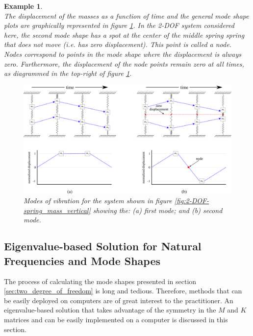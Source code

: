 \documentclass[12pt,letter]{article}
\newtheorem{ex}{Example}
\numberwithin{ex}{section} %
\newenvironment{example}{\begin{mdframed}[middlelinewidth=0.5mm]\begin{ex}\normalfont}{\end{ex}\end{mdframed}}
\numberwithin{re}{section} %
\begin{document}
\begin{example}
\begin{equation}
\end{equation}
The displacement of the masses as a function of time and the general mode shape plots are graphically represented in figure \ref{fig:2-DOF_mode_shape}. In the 2-DOF system considered here, the second mode shape has a spot at the center of the middle spring spring that does not move (i.e. has zero displacement). This point is called a node. Nodes correspond to points in the mode shape where the displacement is always zero. Furthermore, the displacement of the node points remain zero at all times, as diagrammed in the top-right of figure \ref{fig:2-DOF_mode_shape}.

\begin{figure}[H]
	\centering
	\includegraphics[width=\linewidth]{../Figures/2-DOF_mode_shape.png}
	\caption{Modes of vibration for the system shown in figure \ref{fig:2-DOF-spring_mass_vertical} showing the: (a) first mode; and (b) second mode.}
	\label{fig:2-DOF_mode_shape}
\end{figure}
\end{example}

\subsection{Eigenvalue-based Solution for Natural Frequencies and Mode Shapes}

The process of calculating the mode shapes presented in section \ref{sec:two_degree_of_freedom} is long and tedious. Therefore, methods that can be easily deployed on computers are of great interest to the practitioner. An eigenvalue-based solution that takes advantage of the symmetry in the $M$ and $K$ matrices and can be easily implemented on a computer is discussed in this section. 
\end{document}
